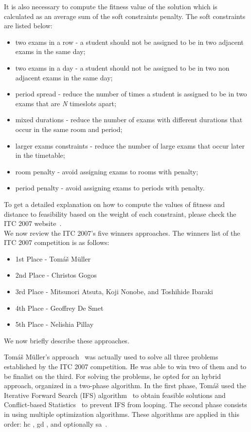 It is also necessary to compute the fitness value of the solution which is calculated as an average sum of the soft constraints penalty. The soft constraints are listed below:
\begin{itemize}
	\item two exams in a row - a student should not be assigned to be in two adjacent exams in the same day;
	\item two exams in a day - a student should not be assigned to be in two non adjacent exams in the same day;
	\item period spread - reduce the number of times a student is assigned to be in two exams that are \textit{N} timeslots apart;
	\item mixed durations - reduce the number of exams with different durations that occur in the same room and period;
	\item larger exams constraints - reduce the number of large exams that occur later in the timetable;
	\item room penalty - avoid assigning exams to rooms with penalty;
	\item period penalty - avoid assigning exams to periods with penalty.
\end{itemize}

To get a detailed explanation on how to compute the values of fitness and distance to feasibility based on the weight of each constraint, please check the ITC 2007 website~\cite{McCollum2008}.\\


We now review the ITC 2007's five winners approaches. The winners list of the ITC 2007 competition is as follows:
\begin{itemize}
	\item 1st Place - Tom\'{a}\v{s} M\"{u}ller
	\item 2nd Place - Christos Gogos
	\item 3rd Place - Mitsunori Atsuta, Koji Nonobe, and Toshihide Ibaraki
	\item 4th Place - Geoffrey De Smet
	\item 5th Place - Nelishia Pillay
\end{itemize}

We now briefly describe these approaches.

Tom\'{a}\v{s} M\"{u}ller's approach~\cite{Mueller2009} was actually used to solve all three problems established by the ITC 2007 competition. He was able to win two of them and to be finalist on the third. For solving the problems, he opted for an hybrid approach, organized in a two-phase algorithm. In the first phase, Tom\'{a}\v{s} used the Iterative Forward Search (IFS) algorithm~\cite{Mueller2005} to obtain feasible solutions and Conflict-based Statistics~\cite{Mueller2004} to prevent IFS from looping. The second phase consists in using multiple optimization algorithms. These algorithms are applied in this order: \gls{hc} \cite{Russell2010}, \gls{gd} \cite{Dueck1993}, and optionally \gls{sa}~\cite{Kirkpatrick1983}.\\

